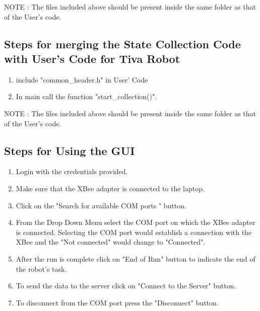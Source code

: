 \documentclass[a4paper,12pt,oneside]{book}
\begin{document}
NOTE : The files included above should be present inside the same folder as that of the User's code.

\subsection{Steps for merging the State Collection Code with User's Code for Tiva Robot}
\begin{enumerate}

\item include "common\_header.h" in User' Code

\item In main call the function  "start\_collection()".

\end{enumerate}


NOTE : The files included above should be present inside the same folder as that of the User's code.

\subsection{Steps for Using the GUI}
\begin{enumerate}

\item Login with the credentials provided.
\item Make sure that the XBee adapter is connected to the laptop.
\item Click on the "Search for available COM ports " button.
\item From the Drop Down Menu select the COM port on which the XBee adapter is connected. Selecting the COM port would establish a connection with the XBee and the "Not connected" would change to "Connected".
\item After the run is complete click on "End of Run" button to indicate the end of the robot's task.
\item To send the data to the server click on "Connect to the Server" button.
\item To disconnect from the COM port press the "Disconnect" button.

\end{enumerate}
\end{document}
